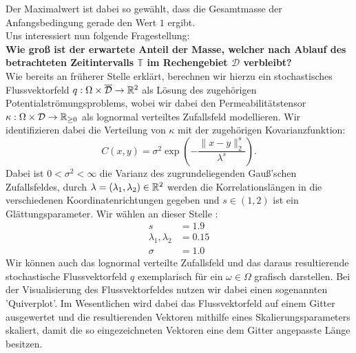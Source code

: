 Der Maximalwert ist dabei so gewählt, dass die Gesamtmasse der Anfangsbedingung gerade den Wert $ 1 $ ergibt.\\
Uns interessiert nun folgende Fragestellung: \\
\textbf{Wie groß ist der erwartete Anteil der Masse, welcher nach Ablauf des betrachteten Zeitintervalls $ \mathbb{T} $ im Rechengebiet $ \mathcal{D} $ verbleibt?}\\

Wie bereits an früherer Stelle erklärt, berechnen wir hierzu ein stochastisches Flussvektorfeld $ q : \Omega \times \overline{\mathcal{ D}} \to \mathbb{R}^2 $ als Lösung des zugehörigen Potentialströmungsproblems, wobei wir dabei den Permeabilitätstensor $ \kappa : \Omega \times \mathcal{D} \to \mathbb{R}_{\geq0} $ als lognormal verteiltes Zufallsfeld modellieren. Wir identifizieren dabei die Verteilung von $ \kappa $ mit der zugehörigen Kovarianzfunktion:
\[
 C(x,y) = \sigma^2 \exp(- \frac{\lVert x-y \rVert_2^s}{\lambda^s} ) .
\]
Dabei ist $ 0 < \sigma^2 < \infty $ die Varianz des zugrundeliegenden Gauß'schen Zufallsfeldes, durch $ \lambda = (\lambda_1,\lambda_2) \in \mathbb{R}^2 $ werden die Korrelationslängen in die verschiedenen Koordinatenrichtungen gegeben und $ s \in (1,2) $ ist ein Glättungsparameter. Wir wählen an dieser Stelle :
\begin{align*}
s &=  1.9\\
\lambda_1,\lambda_2 &= 0.15\\
\sigma &= 1.0
\end{align*}
Wir können auch das lognormal verteilte Zufallsfeld und das daraus resultierende stochastische Flussvektorfeld $ q $ exemplarisch für ein $ \omega \in \Omega $ grafisch darstellen. Bei der Visualisierung des Flussvektorfeldes nutzen wir dabei einen sogenannten 'Quiverplot'. Im Wesentlichen wird dabei das Flussvektorfeld auf einem Gitter ausgewertet und die resultierenden Vektoren mithilfe eines Skalierungsparameters skaliert, damit die so eingezeichneten Vektoren eine dem Gitter angepasste Länge besitzen.

